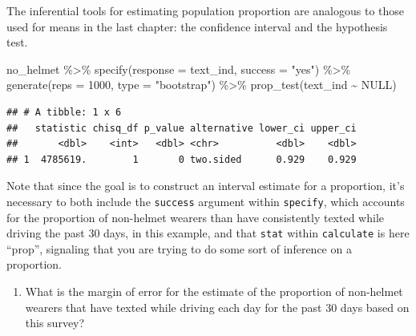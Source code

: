 \documentclass[
]{article}
\newenvironment{Shaded}{\begin{snugshade}}{\end{snugshade}}
\newcommand{\AttributeTok}[1]{\textcolor[rgb]{0.77,0.63,0.00}{#1}}
\newcommand{\ConstantTok}[1]{\textcolor[rgb]{0.00,0.00,0.00}{#1}}
\newcommand{\DecValTok}[1]{\textcolor[rgb]{0.00,0.00,0.81}{#1}}
\newcommand{\FunctionTok}[1]{\textcolor[rgb]{0.00,0.00,0.00}{#1}}
\newcommand{\NormalTok}[1]{#1}
\newcommand{\SpecialCharTok}[1]{\textcolor[rgb]{0.00,0.00,0.00}{#1}}
\newcommand{\StringTok}[1]{\textcolor[rgb]{0.31,0.60,0.02}{#1}}
\providecommand{\tightlist}{%
  \setlength{\itemsep}{0pt}\setlength{\parskip}{0pt}}
\begin{document}
The inferential tools for estimating population proportion are analogous
to those used for means in the last chapter: the confidence interval and
the hypothesis test.

\begin{Shaded}
\begin{Highlighting}[]
\NormalTok{no\_helmet }\SpecialCharTok{\%\textgreater{}\%}
  \FunctionTok{specify}\NormalTok{(}\AttributeTok{response =}\NormalTok{ text\_ind, }\AttributeTok{success =} \StringTok{"yes"}\NormalTok{) }\SpecialCharTok{\%\textgreater{}\%}
  \FunctionTok{generate}\NormalTok{(}\AttributeTok{reps =} \DecValTok{1000}\NormalTok{, }\AttributeTok{type =} \StringTok{"bootstrap"}\NormalTok{) }\SpecialCharTok{\%\textgreater{}\%}
  \FunctionTok{prop\_test}\NormalTok{(text\_ind }\SpecialCharTok{\textasciitilde{}} \ConstantTok{NULL}\NormalTok{)}
\end{Highlighting}
\end{Shaded}

\begin{verbatim}
## # A tibble: 1 x 6
##   statistic chisq_df p_value alternative lower_ci upper_ci
##       <dbl>    <int>   <dbl> <chr>          <dbl>    <dbl>
## 1  4785619.        1       0 two.sided      0.929    0.929
\end{verbatim}

Note that since the goal is to construct an interval estimate for a
proportion, it's necessary to both include the \texttt{success} argument
within \texttt{specify}, which accounts for the proportion of non-helmet
wearers than have consistently texted while driving the past 30 days, in
this example, and that \texttt{stat} within \texttt{calculate} is here
``prop'', signaling that you are trying to do some sort of inference on
a proportion.

\begin{enumerate}
\def\labelenumi{\arabic{enumi}.}
\setcounter{enumi}{2}
\tightlist
\item
  What is the margin of error for the estimate of the proportion of
  non-helmet wearers that have texted while driving each day for the
  past 30 days based on this survey?
\end{enumerate}
\end{document}
